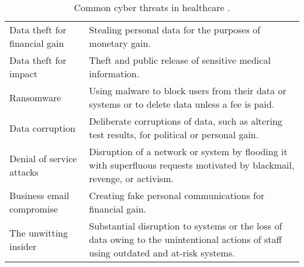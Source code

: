 \documentclass{IEEEtran}
\begin{document}
\begin{table*}[tbh]
	\caption{Common cyber threats in healthcare \cite{martin2017cybersecurity}.}
	\centering
	\begin{tabular}{l l}
		\hline\hline
	Data theft for financial gain & Stealing personal data for the purposes of monetary gain. \\
	Data theft for impact & Theft and public release of sensitive medical information. \\
	Ransomware & Using malware to block users from their data or systems or to delete data unless a fee is paid. \\
	Data corruption & Deliberate corruptions of data, such as altering test results, for political or personal gain. \\
	Denial of service attacks & Disruption of a network or system by flooding it with superfluous requests motivated by blackmail, revenge, or activism. \\
	Business email compromise & Creating fake personal communications for financial gain.\\ 
	The unwitting insider & Substantial disruption to systems or the loss of data owing to the unintentional actions of staff using outdated and at-risk systems. \\
	\hline
	\end{tabular}
	\label{tab:common}
\end{table*}
\end{document}
